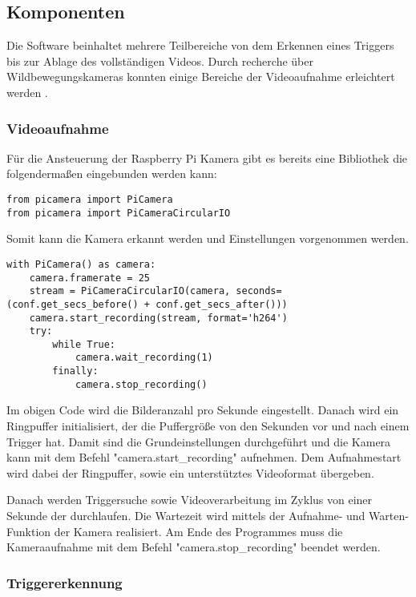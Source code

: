 \subsection{Komponenten}
\label{subsec:evalsys_software}

Die Software beinhaltet mehrere Teilbereiche von dem Erkennen eines Triggers bis zur Ablage des vollständigen Videos. Durch recherche über Wildbewegungskameras konnten einige Bereiche der Videoaufnahme erleichtert werden .

\subsubsection{Videoaufnahme}

Für die Ansteuerung der Raspberry Pi Kamera gibt es bereits eine Bibliothek die folgendermaßen eingebunden werden kann:

\begin{lstlisting}
from picamera import PiCamera
from picamera import PiCameraCircularIO
\end{lstlisting}

Somit kann die Kamera erkannt werden und Einstellungen vorgenommen werden.

\begin{lstlisting}
with PiCamera() as camera:
	camera.framerate = 25
	stream = PiCameraCircularIO(camera, seconds=(conf.get_secs_before() + conf.get_secs_after()))
	camera.start_recording(stream, format='h264')
	try:
		while True:
			camera.wait_recording(1)	
		finally:
			camera.stop_recording()
\end{lstlisting}

Im obigen Code wird die Bilderanzahl pro Sekunde eingestellt. Danach wird ein Ringpuffer initialisiert, der die Puffergröße von den Sekunden vor und nach einem Trigger hat. Damit sind die Grundeinstellungen durchgeführt und die Kamera kann mit dem Befehl "camera.start_recording" aufnehmen. Dem Aufnahmestart wird dabei der Ringpuffer, sowie ein unterstütztes Videoformat übergeben.

Danach werden Triggersuche sowie Videoverarbeitung im Zyklus von einer Sekunde der durchlaufen. Die Wartezeit wird mittels der Aufnahme- und Warten-Funktion der Kamera realisiert. Am Ende des Programmes muss die Kameraaufnahme mit dem Befehl "camera.stop_recording" beendet werden.

\subsubsection{Triggererkennung}


